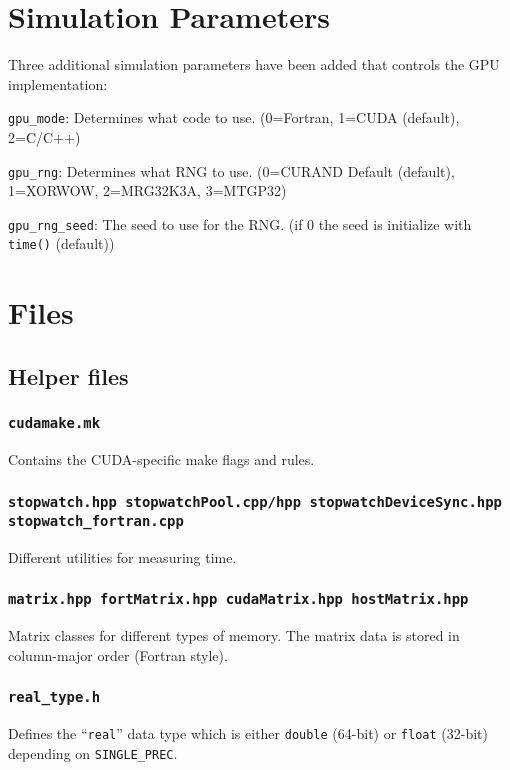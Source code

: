 \documentclass{article}
\begin{document}
\section{Simulation Parameters}

Three additional simulation parameters have been added that controls the GPU 
implementation:

\begin{description}
\item{\verb|gpu_mode|:} Determines what code to use. 
(0=Fortran, 1=CUDA (default), 2=C/C++)
\item{\verb|gpu_rng|:} Determines what RNG to use. 
(0=CURAND Default (default), 1=XORWOW,  2=MRG32K3A, 3=MTGP32)
\item{\verb|gpu_rng_seed|:} The seed to use for the RNG.
(if 0 the seed is initialize with \verb|time()| (default))
\end{description}



\section{Files}

\subsection{Helper files}

\subsubsection{\texttt{cudamake.mk}}
Contains the CUDA-specific make flags and rules.

\subsubsection{\texttt{stopwatch.hpp stopwatchPool.cpp/hpp stopwatchDeviceSync.hpp\\ stopwatch\_fortran.cpp}}
Different utilities for measuring time.

\subsubsection{\texttt{matrix.hpp fortMatrix.hpp cudaMatrix.hpp hostMatrix.hpp}}
Matrix classes for different types of memory. The matrix data is stored in column-major order (Fortran style).

\subsubsection{\texttt{real\_type.h}}
Defines the ``\verb|real|'' data type which is either \verb|double| (64-bit) or \verb|float| (32-bit) depending on \verb|SINGLE_PREC|.
\end{document}
